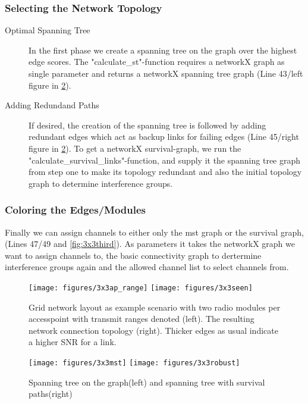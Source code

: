     \subsubsection{Selecting the Network Topology}
      \begin{description}
	\item [Optimal Spanning Tree]
	  In the first phase we create a spanning tree on the graph over the highest edge scores.
	  The "calculate\_st"-function requires a networkX graph as single parameter and returns a networkX spanning tree graph (Line 43/left figure in \ref{fig:3x3second}).
	\item[Adding Redundand Paths]
	  If desired, the creation of the spanning tree is followed by adding redundant edges which act as backup links 
	  for failing edges (Line 45/right figure in \ref{fig:3x3second}). 
	  To get a networkX survival-graph, we run the "calculate\_survival\_links"-function,
	  and supply it the spanning tree graph from step one to make its topology redundant and also 
	  the initial topology graph to determine interference groups.
      \end{description}
    \subsubsection{Coloring the Edges/Modules}
      Finally we can assign channels to either only the mst graph or the survival graph, (Lines 47/49 and \ref{fig:3x3third}).
      As parameters it takes the networkX graph we want to assign channels to, the basic connectivity graph to dertermine 
      interference groups again and the allowed channel list to select channels from. 
      
    \begin{figure}[t]
      \centering
      \texttt{[image: figures/3x3ap\_range]}
      \texttt{[image: figures/3x3seen]}
      \caption{Grid network layout as example scenario with two radio modules per accesspoint with transmit ranges denoted (left). 
	The resulting network connection topology (right). Thicker edges as usual indicate a higher SNR for a link.}
      \label{fig:3x3initial}
    \end{figure}
    
    \begin{figure}[t]
      \centering
      \texttt{[image: figures/3x3mst]}
      \texttt{[image: figures/3x3robust]}
      \caption{Spanning tree on the graph(left) and spanning tree with survival paths(right)}
      \label{fig:3x3second}
    \end{figure}
    
